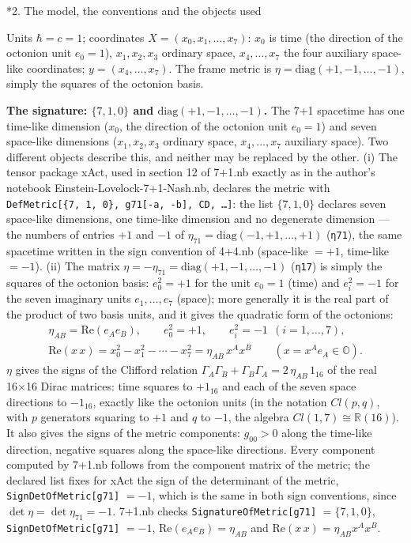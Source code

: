 \documentclass[10pt,a4paper]{article}
\makeatletter
\renewcommand\section{\@startsection{section}{1}{\z@}{-3.5ex \@plus -1ex \@minus -.2ex}{2.3ex \@plus.2ex}{\normalfont\Large\bfseries\raggedright}}
\makeatother
\begin{document}
\section*{2. The model, the conventions and the objects used}
Units $\hbar=c=1$; coordinates $X=(x_0,x_1,\dots,x_7)$: $x_0$ is time (the direction of the octonion unit $e_0=1$), $x_1,x_2,x_3$ ordinary space, $x_4,\dots,x_7$ the four auxiliary space-like coordinates; $y=(x_4,\dots,x_7)$. The frame metric is $\eta=\mathrm{diag}(+1,-1,\dots,-1)$, simply the squares of the octonion basis.

\textbf{The signature: $\{7,1,0\}$ and $\mathrm{diag}(+1,-1,\dots,-1)$.} The 7+1 spacetime has one time-like dimension ($x_0$, the direction of the octonion unit $e_0=1$) and seven space-like dimensions ($x_1,x_2,x_3$ ordinary space, $x_4,\dots,x_7$ auxiliary space). Two different objects describe this, and neither may be replaced by the other. (i) The tensor package xAct, used in section 12 of 7+1.nb exactly as in the author’s notebook Einstein-Lovelock-7+1-Nash.nb, declares the metric with \texttt{DefMetric[\{7, 1, 0\}, g71[-a, -b], CD, …]}: the list $\{7,1,0\}$ declares seven space-like dimensions, one time-like dimension and no degenerate dimension — the numbers of entries $+1$ and $-1$ of $\eta_{71}=\mathrm{diag}(-1,+1,\dots,+1)$ (\texttt{η71}), the same spacetime written in the sign convention of 4+4.nb (space-like $=+1$, time-like $=-1$). (ii) The matrix $\eta=-\eta_{71}=\mathrm{diag}(+1,-1,\dots,-1)$ (\texttt{η17}) is simply the squares of the octonion basis: $e_0^2=+1$ for the unit $e_0=1$ (time) and $e_i^2=-1$ for the seven imaginary units $e_1,\dots,e_7$ (space); more generally it is the real part of the product of two basis units, and it gives the quadratic form of the octonions:
\begin{gather*}
\eta_{AB}=\mathrm{Re}(e_Ae_B),\qquad e_0^2=+1,\qquad e_i^2=-1\ \ (i=1,\dots,7),\\ \mathrm{Re}(x\,x)=x_0^2-x_1^2-\cdots-x_7^2=\eta_{AB}\,x^Ax^B\qquad (x=x^Ae_A\in\mathbb O).
\end{gather*}
$\eta$ gives the signs of the Clifford relation $\Gamma_A\Gamma_B+\Gamma_B\Gamma_A=2\,\eta_{AB}\,1_{16}$ of the real 16×16 Dirac matrices: time squares to $+1_{16}$ and each of the seven space directions to $-1_{16}$, exactly like the octonion units (in the notation $Cl(p,q)$, with $p$ generators squaring to $+1$ and $q$ to $-1$, the algebra $Cl(1,7)\cong\mathbb R(16)$). It also gives the signs of the metric components: $g_{00}>0$ along the time-like direction, negative squares along the space-like directions. Every component computed by 7+1.nb follows from the component matrix of the metric; the declared list fixes for xAct the sign of the determinant of the metric, \texttt{SignDetOfMetric[g71]} $=-1$, which is the same in both sign conventions, since $\det \eta=\det \eta_{71}=-1$. 7+1.nb checks \texttt{SignatureOfMetric[g71]} $=\{7,1,0\}$, \texttt{SignDetOfMetric[g71]} $=-1$, $\mathrm{Re}(e_Ae_B)=\eta_{AB}$ and $\mathrm{Re}(x\,x)=\eta_{AB}x^Ax^B$.
\end{document}
